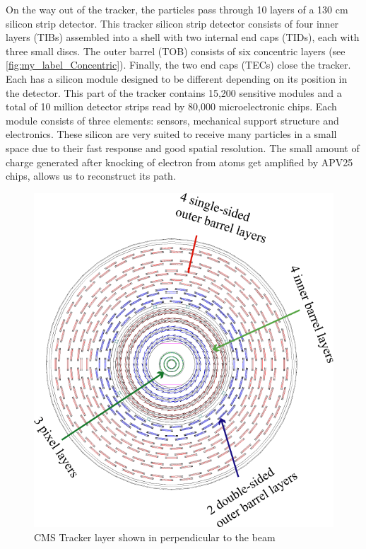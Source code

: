 

On the way out of the tracker, the particles pass through 10 layers of a 130 cm silicon strip detector. This tracker silicon strip detector consists of four inner  layers (TIBs) assembled into a shell with two internal end caps (TIDs), each with three small discs. The outer barrel (TOB) consists of six concentric layers (see \autoref{fig:my_label_Concentric}). Finally, the two end caps (TECs) close  the tracker. Each has a silicon module designed to be different depending on its position in the detector. This part of the tracker contains 15,200  sensitive modules and a total of 10 million detector strips read by 80,000 microelectronic chips. Each module consists of three elements: sensors, mechanical support structure and electronics. These silicon are very suited to receive many particles in a small space due to their fast response and good spatial resolution. The small amount of charge generated after knocking of electron from atoms get amplified by APV25 chips, allows us to reconstruct its path.
\begin{figure}[H]
    \centering
    \includegraphics[scale=0.3]{Detector/Barrel.png}
    \caption{CMS Tracker layer shown in perpendicular to the beam\cite{CMS_6}}
    \label{fig:my_label_Concentric}
\end{figure}


